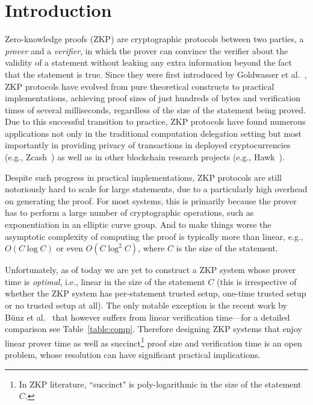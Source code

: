 \section{Introduction}\label{sec:intro}


Zero-knowledge proofs (ZKP) are cryptographic protocols between two parties, a \emph{prover} and a \emph{verifier}, in which the prover can convince the verifier about the validity of a statement without leaking any extra information beyond the fact that the statement is true.  Since they were first introduced by Goldwasser et al.~\cite{goldwasser1989knowledge}, ZKP protocols have evolved from pure theoretical constructs to practical implementations, achieving proof sizes  of just hundreds of bytes and verification times of several milliseconds, regardless of the size of the statement being proved. Due to this successful transition to practice, ZKP protocols have found numerous applications not only in the traditional computation delegation setting but most importantly in providing privacy of transactions in deployed cryptocurrencies (e.g., Zcash~\cite{zerocash}) as well as in other blockchain research projects (e.g., Hawk~\cite{kosba2016hawk}). 




 




 




Despite such progress in practical implementations, ZKP protocols are still notoriously hard to scale for large statements, due to a particularly high overhead on generating the proof. For most systems, this is primarily because the prover has to  perform a large number of cryptographic operations, such as exponentiation in an elliptic curve group. And to make things worse the asymptotic complexity of computing the proof is typically more than linear, e.g., $O(C\log C)$ or even $O(C\log^2 C)$, where $C$ is the size of the statement.

Unfortunately, as of today we are yet to construct a ZKP system whose prover time is \emph{optimal}, i.e., linear in the size of the statement $C$ (this is irrespective of whether the ZKP system has per-statement trusted setup, one-time trusted setup or no trusted setup at all). The only notable exception is the recent work by B{\"u}nz et al.~\cite{bulletproofs} that however suffers from linear verification time---for a detailed comparison  see Table~\ref{table:comp}. Therefore designing ZKP systems that enjoy linear prover time as well as succinct\footnote{In ZKP literature, ``succinct" is poly-logarithmic in the size of the statement $C$.} proof size and verification time is an open problem, whose resolution can have significant practical implications. 



